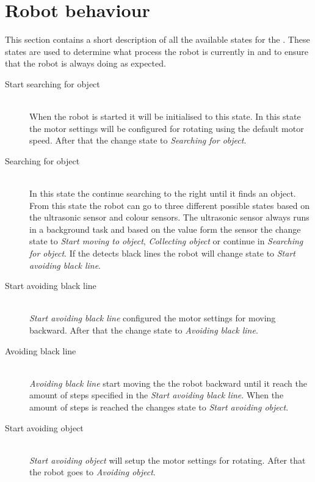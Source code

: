 \section{Robot behaviour} \label{sec:robot_behaviour}
This section contains a short description of all the available states for the \projname{}. These states are used to determine what process the robot is currently in and to ensure that the robot is always doing as expected.

\begin{description}
\item[Start searching for object] \hfill \\
When the robot is started it will be initialised to this state. In this state the motor settings will be configured for rotating using the default motor speed. After that the \projname{} change state to \emph{Searching for object}.

\item[Searching for object] \hfill \\
In this state the \projname{} continue searching to the right until it finds an object. From this state the robot can go to three different possible states based on the ultrasonic sensor and colour sensors. The ultrasonic sensor always runs in a background task and based on the value form the sensor the \projname{} change state to \emph{Start moving to object}, \emph{Collecting object} or continue in \emph{Searching for object}. If the \projname{} detects black lines the robot will change state to \emph{Start avoiding black line}.

\item[Start avoiding black line] \hfill \\
\emph{Start avoiding black line} configured the motor settings for moving backward. After that the \projname{} change state to \emph{Avoiding black line}. 

\item[Avoiding black line] \hfill \\
\emph{Avoiding black line} start moving the the robot backward until it reach the amount of steps specified in the \emph{Start avoiding black line}. When the amount of steps is reached the \projname{} changes state to \emph{Start avoiding object}.

\item[Start avoiding object] \hfill \\
\emph{Start avoiding object} will setup the motor settings for rotating. After that the robot goes to \emph{Avoiding object}. 


\end{description}
